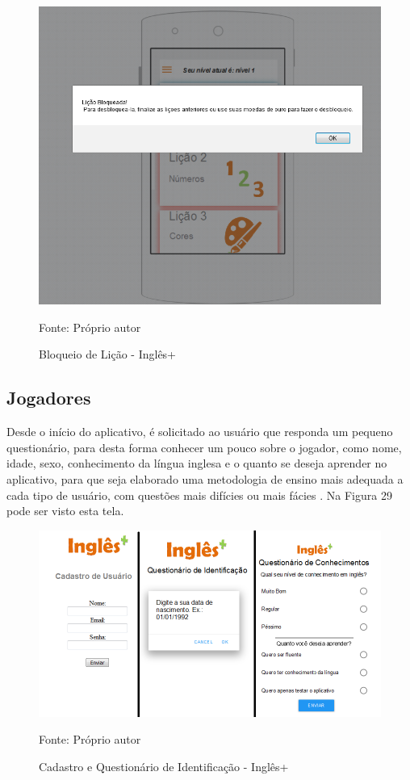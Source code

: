 \documentclass[
	12pt,				%
	openany,			%
	oneside,			%
	a4paper,			%
	english,			%
	french,				%
	spanish,			%
	brazil				%
	]{abntex2}
\begin{document}
\begin{figure}[H]
    \centering
\caption{Bloqueio de Lição - Inglês+}
\includegraphics[width=13cm]{figuras/bloqueio-ingles.png}
\par
 Fonte: Próprio autor
\end{figure}

\subsection{Jogadores}
Desde o início do aplicativo, é solicitado ao usuário que responda um pequeno questionário, para desta forma conhecer um pouco sobre o jogador, como nome, idade, sexo, conhecimento da língua inglesa e o quanto se deseja aprender no aplicativo, para que seja elaborado uma metodologia de ensino mais adequada a cada tipo de usuário, com questões mais difícies ou mais fácies \cite{MORAES}. Na Figura 29 pode ser visto esta tela.

\begin{figure}[H]
    \centering
\caption{Cadastro e Questionário de Identificação - Inglês+}
\includegraphics[width=12cm]{figuras/questionario-ingles+.png}
\par
 Fonte: Próprio autor
\end{figure}
\end{document}
